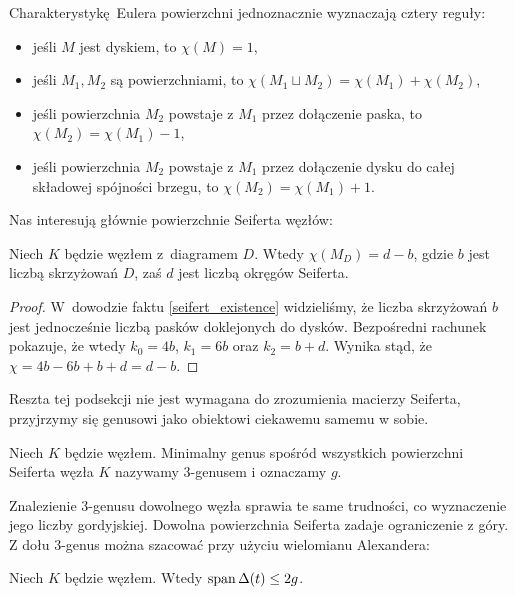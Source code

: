 \begin{proposition}
    Charakterystykę Eulera powierzchni jednoznacznie wyznaczają cztery reguły:
    \begin{itemize}
        \item jeśli $M$ jest dyskiem, to $\chi(M) = 1$,
        \item jeśli $M_1, M_2$ są powierzchniami, to $\chi(M_1 \sqcup M_2) = \chi(M_1) + \chi(M_2)$,
        \item jeśli powierzchnia $M_2$ powstaje z $M_1$ przez dołączenie paska, to $\chi(M_2) = \chi(M_1) - 1$,
        \item jeśli powierzchnia $M_2$ powstaje z $M_1$ przez dołączenie dysku do całej składowej spójności brzegu, to $\chi(M_2) = \chi(M_1) + 1$.
    \end{itemize}
\end{proposition}

Nas interesują głównie powierzchnie Seiferta węzłów:

\begin{proposition}
    \label{euler_and_seifert}
    Niech $K$ będzie węzłem z~diagramem $D$.
    Wtedy $\chi(M_D) = d - b$, gdzie $b$ jest liczbą skrzyżowań $D$, zaś $d$ jest liczbą okręgów Seiferta.
\end{proposition}

\begin{proof}
    W~dowodzie faktu \ref{seifert_existence} widzieliśmy, że liczba skrzyżowań $b$ jest jednocześnie liczbą pasków doklejonych do dysków.
    Bezpośredni rachunek pokazuje, że wtedy $k_0 = 4b$, $k_1 = 6b$ oraz $k_2 = b+d$.
    Wynika stąd, że $\chi = 4b - 6b + b + d = d - b$.
\end{proof}

Reszta tej podsekcji nie jest wymagana do zrozumienia macierzy Seiferta, przyjrzymy się genusowi jako obiektowi ciekawemu samemu w sobie.

\begin{definition}[3-genus]
    Niech $K$ będzie węzłem.
    Minimalny genus spośród wszystkich powierzchni Seiferta węzła $K$ nazywamy 3-genusem i oznaczamy $g$.
\end{definition}

Znalezienie 3-genusu dowolnego węzła sprawia te same trudności, co wyznaczenie jego liczby gordyjskiej.
Dowolna powierzchnia Seiferta zadaje ograniczenie z góry.
Z dołu 3-genus można szacować przy użyciu wielomianu Alexandera:

\begin{proposition}
    \label{prp:alexander_genus}
    Niech $K$ będzie węzłem.
    Wtedy $\operatorname{span} \Delta(t) \le 2g$.
\end{proposition}

